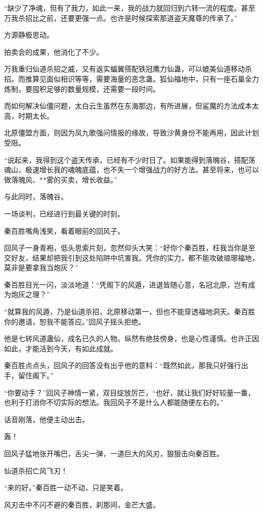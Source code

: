 \begin{this_body}
“缺少了净魂，但有了我力，如此一来，我的战力就回归到六转一流的程度。甚至万我杀招比之前，还要更强一点。也许是时候探索那道盗天魔尊的传承了。”

方源静极思动。

拍卖会的成果，他消化了不少。

万我重归仙道杀招之威，又有返实蝠翼搭配铁冠鹰力仙蛊，可以媲美仙道移动杀招。而推算见面似相识等等，需要海量的恶念蛊。狐仙福地中，只有一座石巢全力炼制，要囤积足够的数量规模，还需要一段时间。

而如何解决仙僵问题，太白云生虽然在东海那边，有所进展，但鲨魔的方法成本太高，时期太长。

北原僵盟方面，则因为凤九歌强问情报的缘故，导致沙黄身份不能再用，因此计划受阻。

“说起来，我得到这个盗天传承，已经有不少时日了。如果能得到落魄谷，搭配荡魂山，极速增长我的魂魄底蕴，也不失一个增强战力的好方法。甚至将来，也可以做落魄风、**雾的买卖，增长收益。”

与此同时，落魄谷。

一场谈判，已经进行到最关键的时刻。

秦百胜嘴角浅笑，看着眼前的回风子。

回风子一身青袍，低头思索片刻，忽然仰头大笑：“好你个秦百胜，枉我当你是至交好友，结果却把我引到这处陷阱中坑害我。凭你的实力，都不能攻破琅琊福地，莫非是要拿我当炮灰？”

秦百胜目光一闪，淡淡地道：“凭阁下的风遁，进退皆随心意，名冠北原，岂有成为炮灰之理？”

“就算我的风遁，乃是仙道杀招，北原移动第一，但也不能穿透福地洞天。秦百胜你的邀请，恕我不能答应。”回风子摇头拒绝。

他是七转风道蛊仙，成名已久的人物。纵然有绝技傍身，也是心性谨慎。也许正因如此，才能活到今天，有如此成就。

秦百胜点点头，回风子的回答没有出乎他的意料：“既然如此，那我只好强行出手，留住阁下。”

“你要动手？”回风子神情一紧，双目绽放厉芒，“也好，就让我们好好较量一番，也利于打消你不切实际的想法。我回风子不是什么人都能随便左右的。”

话音刚落，他便主动出击。

轰！

回风子猛地张开嘴巴，舌尖一弹，一道巨大的风刃，狠狠击向秦百胜。

仙道杀招亡风飞刃！

“来的好。”秦百胜一动不动，只是笑着。

风刃击中不闪不避的秦百胜，刹那间，金芒大盛。


\end{this_body}

